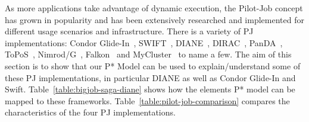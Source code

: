 \documentclass[conference,final]{IEEEtran}
\newcommand{\jhanote}[1]{ {\textcolor{red} { ***shantenu: #1 }}}
\newcommand{\jhanote}[1]{}
\begin{document}

As more applications take advantage of dynamic execution, the Pilot-Job concept
has grown in popularity and has been extensively researched and implemented for
different usage scenarios and infrastructure. There is a variety of PJ
implementations: Condor Glide-In~\cite{condor-g}, SWIFT~\cite{Wilde2011},
DIANE~\cite{Moscicki:908910}, DIRAC~\cite{1742-6596-219-6-062049},
PanDA~\cite{1742-6596-219-6-062041}, ToPoS~\cite{topos},
Nimrod/G~\cite{10.1109/HPC.2000.846563}, Falkon~\cite{1362680} and
MyCluster~\cite{1652061} to name a few. The aim of this section is to show that
our P* Model can be used to explain/understand some of these PJ implementations,
in particular DIANE as well as Condor Glide-In and Swift.
Table~\ref{table:bigjob-saga-diane} shows how the elements P* model can be
mapped to these frameworks. Table~\ref{table:pilot-job-comparison} compares the
characteristics of the four PJ implementations.


\end{document}
